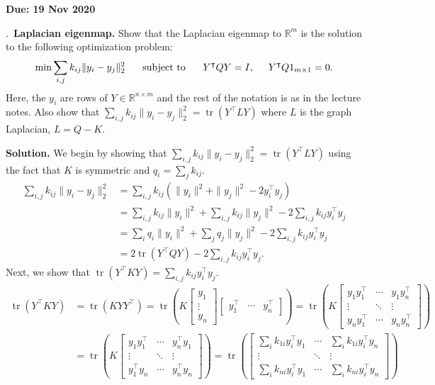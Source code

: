 \documentclass{letter}
\newcounter{problem}
\newcounter{solution}
\newcommand{\Problem}[2]{%
	\stepcounter{problem}%
	\leftskip=0pt%
	\theproblem.~\textbf{{#1.}} #2 \par%
}
\newcommand{\Solution}[1]{%
	\textbf{Solution.} #1 \par%
}
\newcommand{\Due}[1]{\textbf{Due: #1} \par}
\newcommand{\T}{\intercal}
\newcommand{\R}{\mathbb{R}}
\DeclareMathOperator{\tr}{tr}
\begin{document}
    \Due{19 Nov 2020}

    \Problem{Laplacian eigenmap}{Show that the Laplacian eigenmap to $\R^m$ is the solution to the following optimization problem: \begin{align*}
        \min\sum_{i, j} k_{ij}\|y_i - y_j\|_2^2 \hspace{5mm} \text{ subject to } \hspace{5mm} Y^\T Q Y = I, \hspace{5mm} Y^\T Q 1_{m\times 1} = 0.
    \end{align*} Here, the $y_i$ are rows of $Y \in \R^{n \times m}$ and the rest of the notation is as in the lecture notes. Also show that $\sum_{i, j} k_{ij}\|y_i - y_j\|^2_2 = \tr(Y^\T L Y)$ where $L$ is the graph Laplacian, $L = Q - K$.}
    \Solution{We begin by showing that $\sum_{i, j} k_{ij}\|y_i - y_j\|^2_2 = \tr(Y^\T L Y)$ using the fact that $K$ is symmetric and $q_i = \sum_j k_{ij}$. \begin{align*}
        \sum_{i, j} k_{ij}\|y_i - y_j\|^2_2 &= \sum_{i, j} k_{ij}(\|y_i\|^2 + \|y_j\|^2 - 2y_i^\T y_j) \\
        &= \sum_{i, j} k_{ij}\|y_i\|^2 + \sum_{i, j} k_{ij}\|y_j\|^2 - 2 \sum_{i, j} k_{ij}y_i^\T y_j \\
        &= \sum_i q_i \|y_i\|^2 + \sum_j q_j \|y_j\|^2 - 2 \sum_{i, j} k_{ij}y_i^\T y_j \\
        &= 2\tr(Y^\T Q Y) - 2\sum_{i, j} k_{ij}y_i^\T y_j.
    \end{align*} Next, we show that $\tr(Y^\T KY) = \sum_{i, j} k_{ij}y_i^\T y_j$. \begin{align*}
        \tr(Y^\T KY) &= \tr(KYY^\T) = \tr\left(K\begin{bmatrix} y_1 \\ \vdots \\ y_n\end{bmatrix}\begin{bmatrix} y_1^\T & \cdots & y_n^\T \end{bmatrix}\right) = \tr\left(K\begin{bmatrix} y_1y_1^\T & \cdots & y_1y_n^\T \\ \vdots & \ddots & \vdots \\ y_ny_1^\T & \cdots & y_ny_n^\T \end{bmatrix}\right) \\
        &= \tr\left(K\begin{bmatrix} y_1y_1^\T & \cdots & y_n^\T y_1 \\ \vdots & \ddots & \vdots \\ y_1^\T y_n & \cdots & y_n^\T y_n \end{bmatrix}\right) = \tr\left(\begin{bmatrix} \sum_i k_{1i} y_i^\T y_1 & \cdots & \sum_i k_{1i} y_i^\T y_n \\ \vdots & \ddots & \vdots \\ \sum_i k_{ni} y_i^\T y_1 & \cdots & \sum_i k_{ni} y_i^\T y_n \end{bmatrix}\right) \\

\end{align*}}
\end{document}
